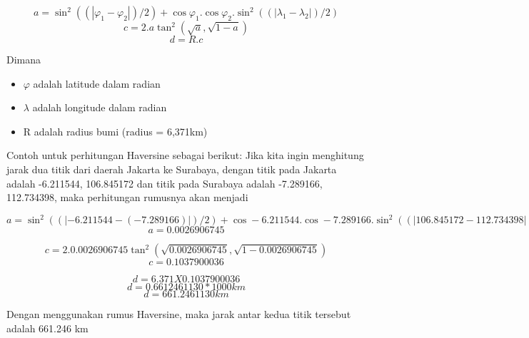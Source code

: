\begin{displaymath}
	a = \sin^{2}((|\varphi_{1}-\varphi_{2}|)/2) + \cos\varphi_{1} . \cos\varphi_{2} . \sin^{2}((|\lambda_{1}-\lambda_{2}|)/2)
\end{displaymath}
\begin{displaymath}
	c = 2 . a\tan^{2}(\sqrt{a}, \sqrt{1-a})
\end{displaymath}
\begin{displaymath}
	d = R . c
\end{displaymath}

Dimana 
\begin{itemize}
	\item $\varphi$ adalah latitude dalam radian
	\item $\lambda$ adalah longitude dalam radian
	\item R adalah radius bumi (radius = 6,371km)
\end{itemize}

Contoh untuk perhitungan Haversine sebagai berikut:
Jika kita ingin menghitung jarak dua titik dari daerah Jakarta ke Surabaya, dengan titik pada Jakarta adalah -6.211544, 106.845172 dan titik pada Surabaya adalah -7.289166, 112.734398, maka perhitungan rumusnya akan menjadi

\begin{displaymath}
	a = \sin^{2}((|-6.211544-(-7.289166)|)/2) + \cos-6.211544 . \cos-7.289166 . \sin^{2}((|106.845172-112.734398|)/2)
\end{displaymath}
\begin{displaymath}
	a = 0.0026906745
\end{displaymath}

\begin{displaymath}
	c = 2 . 0.0026906745\tan^{2}(\sqrt{0.0026906745}, \sqrt{1-0.0026906745})
\end{displaymath}
\begin{displaymath}
	c =  0.1037900036
\end{displaymath}

\begin{displaymath}
	d = 6.371 X 0.1037900036
\end{displaymath}
\begin{displaymath}
	d = 0.6612461130 * 1000 km
\end{displaymath}
\begin{displaymath}
	d = 661.2461130 km
\end{displaymath}

Dengan menggunakan rumus Haversine, maka jarak antar kedua titik tersebut adalah 661.246 km

